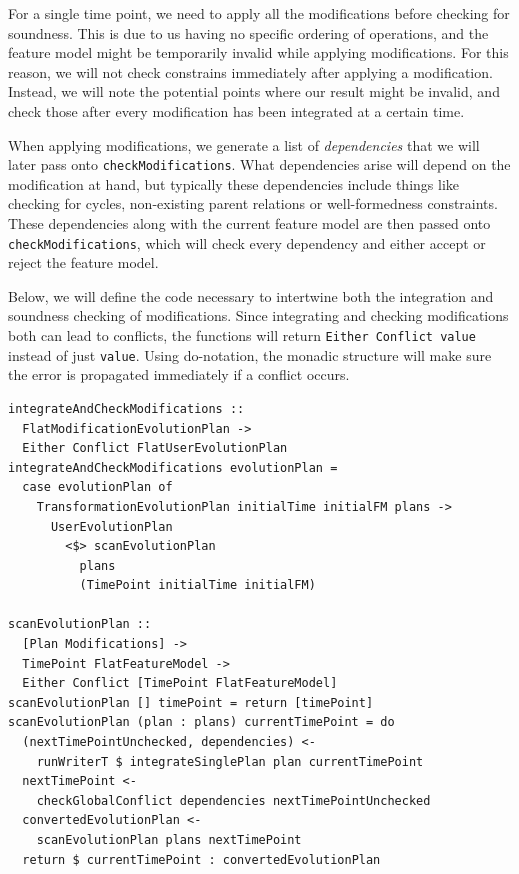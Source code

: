 \documentclass[a4paper,english]{ifimaster}
\begin{document}
For a single time point, we need to apply all the modifications before checking for soundness. This is due to us having no specific ordering of operations, and the feature model might be temporarily invalid while applying modifications. For this reason, we will not check constrains immediately after applying a modification. Instead, we will note the potential points where our result might be invalid, and check those after every modification has been integrated at a certain time.

When applying modifications, we generate a list of \textit{dependencies} that we will later pass onto \texttt{checkModifications}. What dependencies arise will depend on the modification at hand, but typically these dependencies include things like checking for cycles, non-existing parent relations or well-formedness constraints. These dependencies along with the current feature model are then passed onto \texttt{checkModifications}, which will check every dependency and either accept or reject the feature model.

Below, we will define the code necessary to intertwine both the integration and soundness checking of modifications. Since integrating and checking modifications both can lead to conflicts, the functions will return \texttt{Either Conflict value} instead of just \texttt{value}. Using do-notation, the monadic structure will make sure the error is propagated immediately if a conflict occurs.

\begin{verbatim}
integrateAndCheckModifications ::
  FlatModificationEvolutionPlan ->
  Either Conflict FlatUserEvolutionPlan
integrateAndCheckModifications evolutionPlan =
  case evolutionPlan of
    TransformationEvolutionPlan initialTime initialFM plans ->
      UserEvolutionPlan
        <$> scanEvolutionPlan
          plans
          (TimePoint initialTime initialFM)

scanEvolutionPlan ::
  [Plan Modifications] ->
  TimePoint FlatFeatureModel ->
  Either Conflict [TimePoint FlatFeatureModel]
scanEvolutionPlan [] timePoint = return [timePoint]
scanEvolutionPlan (plan : plans) currentTimePoint = do
  (nextTimePointUnchecked, dependencies) <-
    runWriterT $ integrateSinglePlan plan currentTimePoint
  nextTimePoint <-
    checkGlobalConflict dependencies nextTimePointUnchecked
  convertedEvolutionPlan <-
    scanEvolutionPlan plans nextTimePoint
  return $ currentTimePoint : convertedEvolutionPlan
\end{verbatim}
\end{document}
